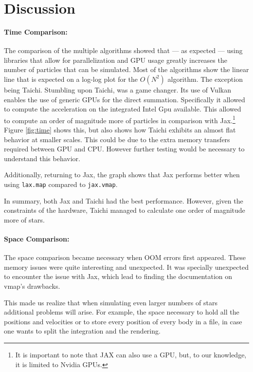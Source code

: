 \documentclass[a4paper, 11pt]{article}         %
\begin{document}
\section{Discussion}

\paragraph{Time Comparison:}
The comparison of the multiple algorithms showed that --- as expected --- using libraries that allow for parallelization and GPU usage greatly increases the number of particles that can be simulated. Most of the algorithms show the linear line that is expected on a log-log plot for the $O(N^2)$ algorithm. 
The exception being Taichi.
Stumbling upon Taichi, was a game changer. Its use of Vulkan enables the use of generic GPUs for the direct summation. Specifically it allowed to compute the acceleration on the integrated Intel Gpu available.
This allowed to compute an order of magnitude more of particles in comparison with Jax.\footnote{It is important to note that JAX can also use a GPU, but, to our knowledge, it is limited to Nvidia GPUs.}
Figure \ref{fig:time} shows this, but also shows how Taichi exhibits an almost flat behavior at smaller scales.
This could be due to the extra memory transfers required between GPU and CPU. However further testing would be necessary to understand this behavior.

Additionally, returning to Jax, the graph shows that Jax performs better when using \texttt{lax.map} compared to \texttt{jax.vmap}.

In summary, both Jax and Taichi had the best performance. However, given the constraints of the hardware, Taichi managed to calculate one order of magnitude more of stars.

\paragraph{Space Comparison:}
The space comparison became necessary when OOM errors first appeared.
These memory issues were quite interesting and unexpected. It was specially unexpected to encounter the issue with Jax, which lead to finding the documentation on vmap's drawbacks.

This made us realize that when simulating even larger numbers of stars additional problems will arise.
For example, the space necessary to hold all the positions and velocities or to store every position of every body in a file, in case one wants to split the integration and the rendering.
\end{document}
